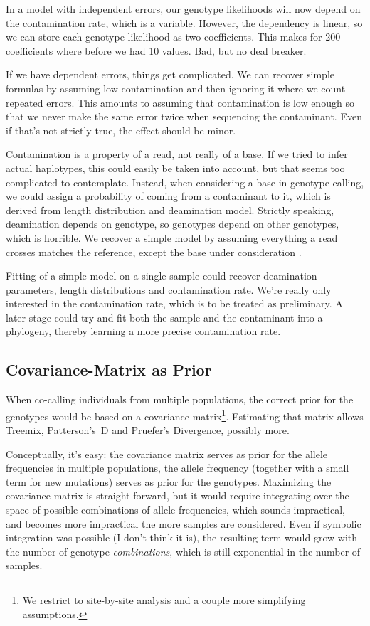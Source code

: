 \documentclass{article}
\begin{document}
In a model with independent errors, our genotype likelihoods will now
depend on the contamination rate, which is a variable.  However, the
dependency is linear, so we can store each genotype
likelihood as two coefficients.  This makes for 200 coefficients where
before we had 10 values.  Bad, but no deal breaker.

If we have dependent errors, things get complicated.  We can recover
simple formulas by assuming low contamination and then ignoring it where
we count repeated errors.  This amounts to assuming that contamination
is low enough so that we never make the same error twice when sequencing
the contaminant.  Even if that's not strictly true, the effect should be
minor.

Contamination is a property of a read, not really of a base.  If we
tried to infer actual haplotypes, this could easily be taken into
account, but that seems too complicated to contemplate.  Instead, when
considering a base in genotype calling, we could assign a probability of
coming from a contaminant to it, which is derived from length
distribution and deamination model.  Strictly speaking, deamination
depends on genotype, so genotypes depend on other genotypes, which is
horrible.  We recover a simple model by assuming everything a read
crosses matches the reference, except the base under consideration
.

Fitting of a simple model on a single sample could recover deamination
parameters, length distributions and contamination rate.  We're really
only interested in the contamination rate, which is to be treated as
preliminary.  A later stage could try and fit both the sample and the
contaminant into a phylogeny, thereby learning a more precise
contamination rate.

\subsection{Covariance-Matrix as Prior}

When co-calling individuals from multiple populations, the correct prior
for the genotypes would be based on a covariance matrix\footnote{We
restrict to site-by-site analysis and a couple more simplifying
assumptions.}.  Estimating
that matrix allows Treemix, Patterson's~D and Pruefer's Divergence,
possibly more.  %

Conceptually, it's easy:  the covariance matrix serves as prior for the
allele frequencies in multiple populations, the allele frequency
(together with a small term for new mutations) serves as prior for the
genotypes.  Maximizing the covariance matrix is
straight forward, but it would require integrating over the space of
possible combinations of allele frequencies, which sounds impractical,
and becomes more impractical the more samples are considered.  Even if
symbolic integration was possible (I don't think it is), the resulting
term would grow with the number of genotype \emph{combinations}, which
is still exponential in the number of samples.
\end{document}
